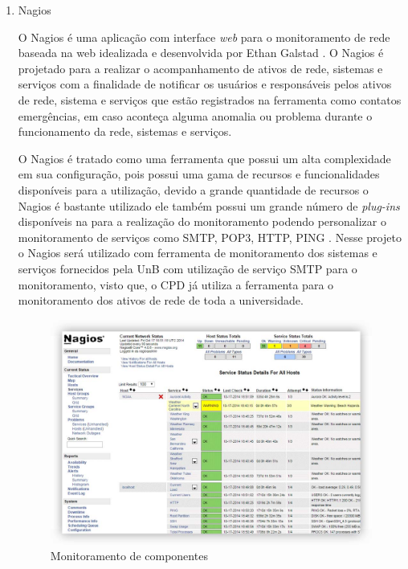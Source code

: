 \begin{enumerate}
\item Nagios

O Nagios é uma aplicação com interface \textit{web} para o monitoramento de rede baseada na web idealizada e desenvolvida por Ethan Galstad \cite{bin2011new}. O Nagios é projetado para a realizar o acompanhamento de ativos de rede, sistemas e serviços com a finalidade de notificar os usuários e responsáveis pelos ativos de rede, sistema e serviços que estão registrados na ferramenta como contatos emergências, em caso aconteça alguma anomalia ou problema durante o funcionamento da rede, sistemas e serviços.

O Nagios é tratado como uma ferramenta que possui um alta complexidade em sua configuração, pois possui uma gama de recursos e funcionalidades disponíveis para a utilização, devido a grande quantidade de recursos o Nagios é bastante utilizado ele também possui um grande número de \textit{plug-ins} disponíveis na para a realização do monitoramento podendo personalizar o monitoramento de serviços como SMTP, POP3, HTTP, PING \cite{lcc2012nagios}. Nesse projeto o Nagios será utilizado com ferramenta de monitoramento dos sistemas e serviços fornecidos pela \acrshort{UnB} com utilização de serviço SMTP para o monitoramento, visto que, o \acrshort{CPD} já utiliza a ferramenta para o monitoramento dos ativos de rede de toda a universidade. 

\begin{figure}[h!]
	\begin{center}
	\includegraphics[scale = 0.39]{img/Comprehensive_Monitoring_Drop2.jpg}
		\caption{Monitoramento de componentes\cite{lcc2012nagios}}
		\label{fun:fig:nagios}
	\end{center}
\end{figure}


\end{enumerate}
